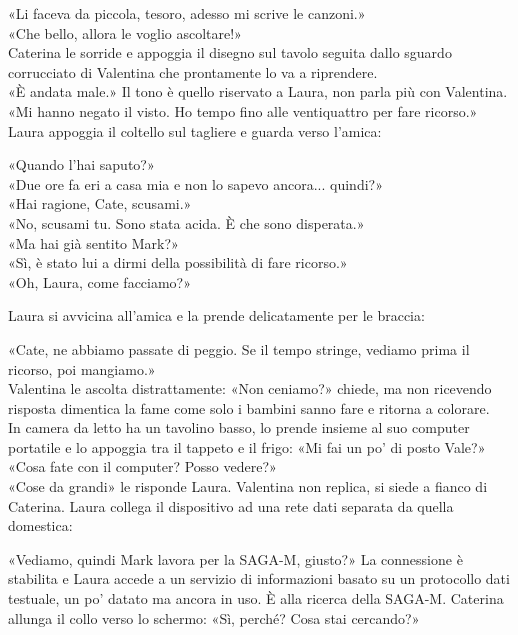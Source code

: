 «Li faceva da piccola, tesoro, adesso mi scrive le canzoni.»
\\
«Che bello, allora le voglio ascoltare!»\\

Caterina le sorride e appoggia il disegno sul tavolo seguita dallo sguardo corrucciato di Valentina che prontamente lo va a riprendere.\\

«\`E andata male.» Il tono \`e quello riservato a Laura, non parla pi\`u con Valentina. «Mi hanno negato il visto. Ho tempo fino alle ventiquattro per fare ricorso.»\\

Laura appoggia il coltello sul tagliere e guarda verso l’amica:

«Quando l’hai saputo?»\\
«Due ore fa eri a casa mia e non lo sapevo ancora... quindi?»\\
«Hai ragione, Cate, scusami.»\\
«No, scusami tu. Sono stata acida. \`E che sono disperata.»\\
«Ma hai gi\`a sentito Mark?»\\
«Sì, \`e stato lui a dirmi della possibilità di fare ricorso.»\\
«Oh, Laura, come facciamo?»

Laura si avvicina all'amica e la prende delicatamente per le braccia:

«Cate, ne abbiamo passate di peggio. Se il tempo stringe, vediamo prima il ricorso, poi mangiamo.»\\

Valentina le ascolta distrattamente:
«Non ceniamo?» chiede, ma non ricevendo risposta dimentica la fame come solo i bambini sanno fare e ritorna a colorare.\\

In camera da letto ha un tavolino basso, lo prende insieme al suo computer  portatile e lo appoggia tra il tappeto e il frigo: «Mi fai un po' di posto Vale?»\\
«Cosa fate con il computer? Posso vedere?»\\
«Cose da grandi» le risponde Laura. Valentina non replica, si siede a fianco di Caterina. Laura collega il dispositivo ad una rete dati separata da quella domestica:

«Vediamo, quindi Mark lavora per la SAGA-M, giusto?» La connessione \`e stabilita e Laura accede a un servizio di informazioni basato su un protocollo dati testuale, un po' datato ma ancora in uso. \`E alla ricerca della SAGA-M. Caterina allunga il collo verso lo schermo:
«Sì, perch\'e? Cosa stai cercando?»\\

